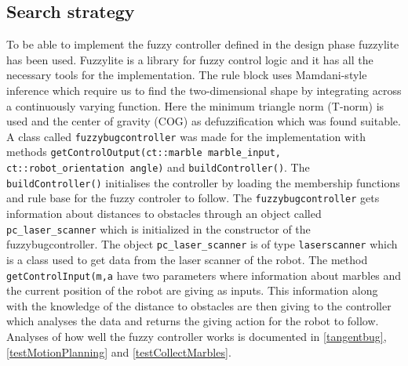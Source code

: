 \documentclass[../Head/Main.tex]{subfiles}
\begin{document}
\subsection{Search strategy}
\label{subsec:searhStrategyImplementation}

To be able to implement the fuzzy controller defined in the design phase fuzzylite has been used. Fuzzylite is a library for fuzzy control logic and it has all the necessary tools for the implementation. The rule block uses Mamdani-style inference which require us to find the two-dimensional shape by integrating across a continuously varying function. Here the minimum triangle norm (T-norm) is used and the center of gravity (COG) as defuzzification which was found suitable. A class called \texttt{fuzzybugcontroller} was made for the implementation with methods \texttt{getControlOutput(ct::marble marble\_input, ct::robot\_orientation angle)} and \texttt{buildController()}. The \texttt{buildController()} initialises the controller by loading the membership functions and rule base for the fuzzy controler to follow. The \texttt{fuzzybugcontroller} gets information about distances to obstacles through an object called \texttt{pc\_laser\_scanner} which is initialized in the constructor of the fuzzybugcontroller. The object \texttt{pc\_laser\_scanner} is of type \texttt{laserscanner} which is a class used to get data from the laser scanner of the robot. The method \texttt{getControlInput(m,a} have two parameters where information about marbles and the current position of the robot are giving as inputs. This information along with the knowledge of the distance to obstacles are then giving to the controller which analyses the data and returns the giving action for the robot to follow. Analyses of how well the fuzzy controller works is documented in \ref{tangentbug}, \ref{testMotionPlanning} and \ref{testCollectMarbles}.        	
\end{document}
